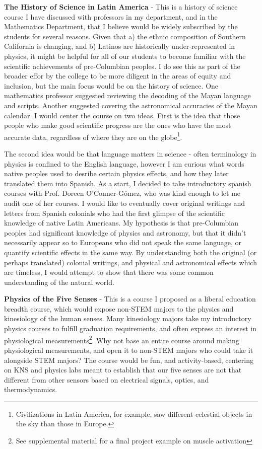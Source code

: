 \documentclass[../../main.tex]{subfiles}
\begin{document}
\textbf{The History of Science in Latin America} - This is a history of science course I have discussed with professors in my department, and in the Mathematics Department, that I believe would be widely subscribed by the students for several reasons.  Given that a) the ethnic composition of Southern California is changing, and b) Latinos are historically under-represented in physics, it might be helpful for all of our students to become familiar with the scientific achievements of pre-Columbian peoples.  I do see this as part of the broader effor by the college to be more diligent in the areas of equity and inclusion, but the main focus would be on the history of science.  One mathematics professor suggested reviewing the decoding of the Mayan language and scripts.  Another suggested covering the astronomical accuracies of the Mayan calendar.  I would center the course on two ideas. First is the idea that those people who make good scientific progress are the ones who have the most accurate data, regardless of where they are on the globe\footnote{Civilizations in Latin America, for example, saw different celestial objects in the sky than those in Europe.}. \\ \hspace{0.1cm}

The second idea would be that language matters in science - often terminology in physics is confined to the English language, however I am curious what words native peoples used to desribe certain physics effects, and how they later translated them into Spanish.  As a start, I decided to take introductory spanish courses with Prof. Doreen O'Conner-G\'{o}mez, who was kind enough to let me audit one of her courses.  I would like to eventually cover original writings and letters from Spanish colonials who had the first glimpse of the scientific knowledge of native Latin Americans.  My hypothesis is that pre-Columbian peoples had significant knowledge of physics and astronomy, but that it didn't necessarily appear so to Europeans who did not speak the same language, or quantify scientific effects in the same way.  By understanding both the original (or perhaps translated) colonial writings, and physical and astronomical effects which are timeless, I would attempt to show that there was some common understanding of the natural world. \\ \hspace{0.1cm}

\textbf{Physics of the Five Senses} - This is a course I proposed as a liberal education breadth course, which would expose non-STEM majors to the physics and kinesiology of the human senses.  Many kinesiology majors take my introductory physics courses to fulfill graduation requirements, and often express an interest in physiological measurements\footnote{See supplemental material for a final project example on muscle activation}.  Why not base an entire course around making physiological measurements, and open it to non-STEM majors who could take it alongside STEM majors?  The course would be fun, and activity-based, centering on KNS and physics labs meant to establish that our five senses are not that different from other sensors based on electrical signals, optics, and thermodynamics.
\end{document}

